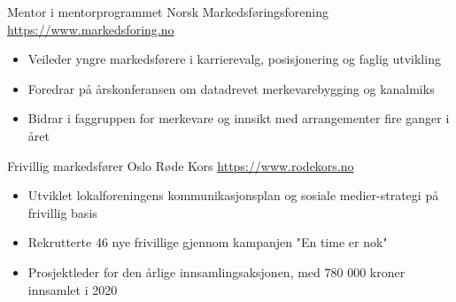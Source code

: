 \documentclass[a4paper, serif, 10pt]{moderncv}
\begin{document}
        {Mentor i mentorprogrammet}
        {Norsk Markedsføringsforening}
        {\url{https://www.markedsforing.no}}
        {}
        {\begin{itemize}
\item Veileder yngre markedsførere i karrierevalg, posisjonering og faglig utvikling
\item Foredrar på årskonferansen om datadrevet merkevarebygging og kanalmiks
\item Bidrar i faggruppen for merkevare og innsikt med arrangementer fire ganger i året
\end{itemize}}
    

        {Frivillig markedsfører}
        {Oslo Røde Kors}
        {\url{https://www.rodekors.no}}
        {}
        {\begin{itemize}
\item Utviklet lokalforeningens kommunikasjonsplan og sosiale medier-strategi på frivillig basis
\item Rekrutterte 46 nye frivillige gjennom kampanjen "En time er nok"
\item Prosjektleder for den årlige innsamlingsaksjonen, med 780 000 kroner innsamlet i 2020
\end{itemize}}
    
\end{document}
